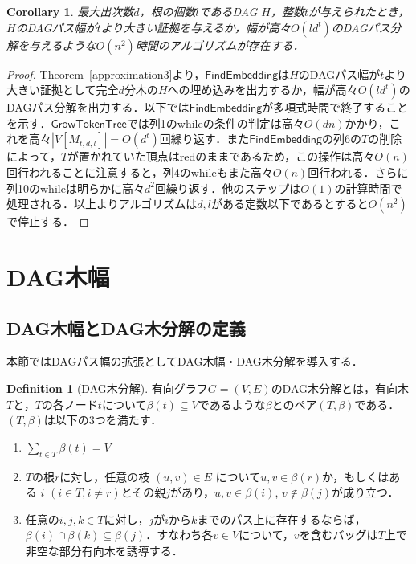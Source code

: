 \documentclass[master]{kuisthesis}		%
\theoremstyle{plain}
\newtheorem{cor}{Corollary}
\theoremstyle{definition}
\newtheorem{definition*}{Definition}
\begin{document}
\begin{cor}
    最大出次数$d$，根の個数$l$であるDAG $H$，整数$t$が与えられたとき，$H$のDAGパス幅が$t$より大きい証拠を与えるか，幅が高々$O(ld^t)$のDAGパス分解を与えるような$O(n^2)$時間のアルゴリズムが存在する．
\end{cor}

\begin{proof}
    Theorem~\ref{approximation3}より，$\mathsf{FindEmbedding}$は$H$のDAGパス幅が$t$より大きい証拠として完全$d$分木の$H$への埋め込みを出力するか，幅が高々$O(ld^t)$のDAGパス分解を出力する．以下では$\mathsf{FindEmbedding}$が多項式時間で終了することを示す．$\mathsf{GrowTokenTree}$では列1のwhileの条件の判定は高々$O(dn)$かかり，これを高々$|V[M_{t, d, l}]| = O(d^t)$回繰り返す．また$\mathsf{FindEmbedding}$の列6の$T$の削除によって，$T$が置かれていた頂点はredのままであるため，この操作は高々$O(n)$回行われることに注意すると，列4のwhileもまた高々$O(n)$回行われる．さらに列10のwhileは明らかに高々$d^2$回繰り返す．他のステップは$O(1)$の計算時間で処理される．以上よりアルゴリズムは$d, l$がある定数以下であるとすると$O(n^2)$で停止する．
\end{proof}



















\section{DAG木幅} %

\subsection{DAG木幅とDAG木分解の定義}

本節ではDAGパス幅の拡張としてDAG木幅・DAG木分解を導入する．

\begin{definition*}[DAG木分解]
 有向グラフ$G=(V, E)$のDAG木分解とは，有向木$T$と，$T$の各ノード$t$について$\beta(t) \subseteq V$であるような$\beta$とのペア$(T, \beta)$である．$(T, \beta)$は以下の3つを満たす．
 
\begin{enumerate}
    \item $\sum_{t\in T} \beta(t) = V$ 
    \item $T$の根$r$に対し，任意の枝 $ (u, v) \in E $ について$u, v \in \beta(r)$か，もしくはある $i$ $(i \in T, i \neq r)$とその親$j$があり，$u, v \in \beta(i)$, $v \notin \beta(j)$が成り立つ．
    \item 任意の$ i, j, k \in T$に対し，$j$が$i$から$k$までのパス上に存在するならば，$\beta(i) \cap \beta(k) \subseteq \beta(j)$．すなわち各$v \in V$について，$v$を含むバッグは$T$上で非空な部分有向木を誘導する．
    \end{enumerate}
\end{definition*}
\end{document}
